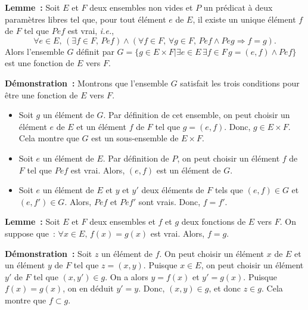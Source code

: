\medskip

\noindent\textbf{Lemme :} Soit $E$ et $F$ deux ensembles non vides et $P$ un prédicat à deux paramètres libres tel que, pour tout élément $e$ de $E$, il existe un unique élément $f$ de $F$ tel que $P e f$ est vrai, \textit{i.e.}, 
\begin{equation*}
    \forall e \in E, \, 
        (\exists f \in F, \, P e f)
        \wedge 
        (\forall f \in F, \, \forall g \in F, \, P e f \wedge P e g \Rightarrow f = g) .
\end{equation*}
Alors l'ensemble $G$ définit par $G = \lbrace g \in E \times F \vert \exists e \in E \, \exists f \in F \, g = (e,f) \wedge P e f \rbrace$ est une fonction de $E$ vers $F$. 

\medskip

\noindent\textbf{Démonstration :} Montrons que l'ensemble $G$ satisfait les trois conditions pour être une fonction de $E$ vers $F$.
\begin{itemize}[nosep]
    \item Soit $g$ un élément de $G$. 
        Par définition de cet ensemble, on peut choisir un élément $e$ de $E$ et un élément $f$ de $F$ tel que $g = (e,f)$. 
        Donc, $g \in E \times F$. 
        Cela montre que $G$ est un sous-ensemble de $E \times F$.
    \item Soit $e$ un élément de $E$.
        Par définition de $P$, on peut choisir un élément $f$ de $F$ tel que $P e f$ est vrai.
        Alors, $(e,f)$ est un élément de $G$.
    \item Soit $e$ un élément de $E$ et $y$ et $y'$ deux éléments de $F$ tels que $(e,f) \in G$ et $(e,f') \in G$.
        Alors, $P e f$ et $P e f'$ sont vrais.
        Donc, $f = f'$. 
\end{itemize}

\done

\medskip

\noindent\textbf{Lemme :} Soit $E$ et $F$ deux ensembles et $f$ et $g$ deux fonctions de $E$ vers $F$. 
    On suppose que : $\forall x \in E, \, f(x) = g(x)$ est vrai. 
    Alors, $f = g$.

\medskip

\noindent\textbf{Démonstration :} 
    Soit $z$ un élément de $f$. 
    On peut choisir un élément $x$ de $E$ et un élément $y$ de $F$ tel que $z = (x,y)$. 
    Puisque $x \in E$, on peut choisir un élément $y'$ de $F$ tel que $(x,y') \in g$. 
    On a alors $y = f(x)$ et $y' = g(x)$. 
    Puisque $f(x) = g(x)$, on en déduit $y' = y$. 
    Donc, $(x,y) \in g$, et donc $z \in g$. 
    Cela montre que $f \subset g$.
    
